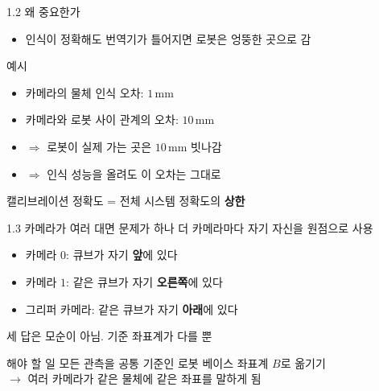 \documentclass[aspectratio=169,11pt]{beamer}
\begin{document}
\begin{frame}{1.2 왜 중요한가}
  \begin{itemize}
    \item 인식이 정확해도 번역기가 틀어지면 로봇은 엉뚱한 곳으로 감
  \end{itemize}
  \vfill
  \begin{block}{예시}
    \begin{itemize}
      \item 카메라의 물체 인식 오차: $1\,\mathrm{mm}$
      \item 카메라와 로봇 사이 관계의 오차: $10\,\mathrm{mm}$
      \item $\Rightarrow$ 로봇이 실제 가는 곳은 $10\,\mathrm{mm}$ 빗나감
      \item $\Rightarrow$ 인식 성능을 올려도 이 오차는 그대로
    \end{itemize}
  \end{block}
  \vfill
  \begin{alertblock}{}
    캘리브레이션 정확도 = 전체 시스템 정확도의 \textbf{상한}
  \end{alertblock}
\end{frame}

\begin{frame}{1.3 카메라가 여러 대면 문제가 하나 더}
  카메라마다 자기 자신을 원점으로 사용
  \begin{itemize}
    \item 카메라 $0$: 큐브가 자기 \textbf{앞}에 있다
    \item 카메라 $1$: 같은 큐브가 자기 \textbf{오른쪽}에 있다
    \item 그리퍼 카메라: 같은 큐브가 자기 \textbf{아래}에 있다
  \end{itemize}
  \vfill
  세 답은 모순이 아님. 기준 좌표계가 다를 뿐
  \vfill
  \begin{block}{해야 할 일}
    모든 관측을 공통 기준인 로봇 베이스 좌표계 $B$로 옮기기\\
    $\rightarrow$ 여러 카메라가 같은 물체에 같은 좌표를 말하게 됨
  \end{block}
\end{frame}
\end{document}
